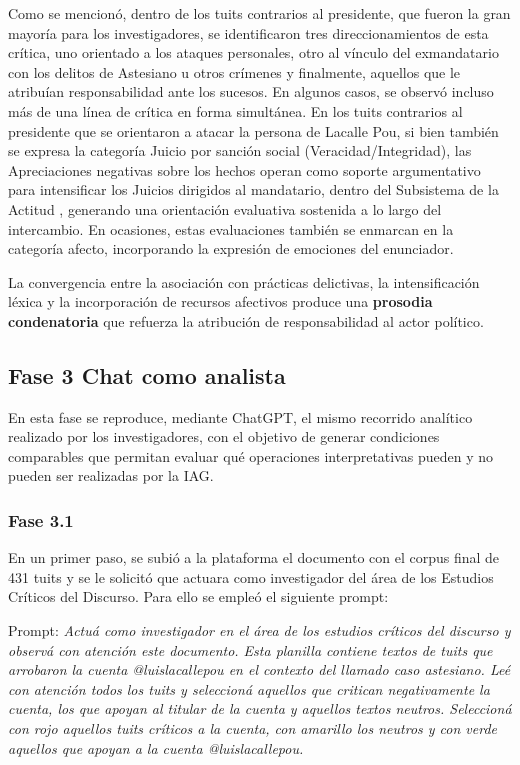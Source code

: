 \documentclass[spanish]{textolivre}
\begin{document}
Como se mencionó, dentro de los tuits contrarios al presidente, que fueron la gran mayoría para los investigadores, se identificaron tres direccionamientos de esta crítica, uno orientado a los ataques personales, otro al vínculo del exmandatario con los delitos de Astesiano u otros crímenes y finalmente, aquellos que le atribuían responsabilidad ante los sucesos. En algunos casos, se observó incluso más de una línea de crítica en forma simultánea. En los tuits contrarios al presidente que se orientaron a atacar la persona de Lacalle Pou, si bien también se expresa la categoría Juicio por sanción social (Veracidad/Integridad), las Apreciaciones negativas sobre los hechos operan como soporte argumentativo para intensificar los Juicios dirigidos al mandatario, dentro del Subsistema de la Actitud \cite{martin2005language}, generando una orientación evaluativa sostenida a lo largo del intercambio. En ocasiones, estas evaluaciones también se enmarcan en la categoría afecto, incorporando la expresión de emociones del enunciador.

La convergencia entre la asociación con prácticas delictivas, la intensificación léxica y la incorporación de recursos afectivos produce una \textbf{prosodia condenatoria} que refuerza la atribución de responsabilidad al actor político.



\subsection{Fase 3 Chat como analista}\label{sec-contributors-expl}
En esta fase se reproduce, mediante ChatGPT, el mismo recorrido analítico realizado por los investigadores, con el objetivo de generar condiciones comparables que permitan evaluar qué operaciones interpretativas pueden y no pueden ser realizadas por la IAG.

\subsubsection{Fase 3.1}
En un primer paso, se subió a la plataforma el documento con el corpus final de 431 tuits y se le solicitó que actuara como investigador del área de los Estudios Críticos del Discurso. Para ello se empleó el siguiente prompt:

Prompt: \textit{Actuá como investigador en el área de los estudios críticos del discurso y observá con atención este documento. Esta planilla contiene textos de tuits que arrobaron la cuenta @luislacallepou en el contexto del llamado caso astesiano. Leé con atención todos los tuits y seleccioná aquellos que critican negativamente la cuenta, los que apoyan al titular de la cuenta y aquellos textos neutros. Seleccioná con rojo aquellos tuits críticos a la cuenta, con amarillo los neutros y con verde aquellos que apoyan a la cuenta @luislacallepou.}
\end{document}
